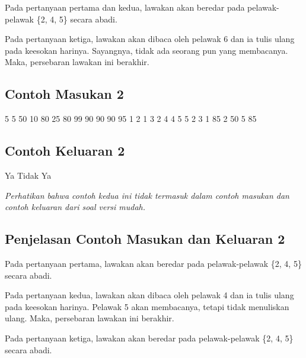 \documentclass[../main_problemset.tex]{subfiles} %
\begin{document}
Pada pertanyaan pertama dan kedua, lawakan akan beredar pada pelawak-pelawak \{2, 4, 5\} secara abadi.

Pada pertanyaan ketiga, lawakan akan dibaca oleh pelawak 6 dan ia tulis ulang pada keesokan harinya. Sayangnya, tidak ada seorang pun yang membacanya. Maka, persebaran lawakan ini berakhir.

\vspace{.4cm}

\begin{minipage}[t]{0.5\textwidth}
\subsection*{Contoh Masukan 2}

\begin{lcverbatim}
5 5
50 10 80 25 80
99 90 90 90 95
1 2
1 3
2 4
4 5
5 2
3
1 85
2 50
5 85
\end{lcverbatim}
\end{minipage}
\begin{minipage}[t]{0.5\textwidth}
\subsection*{Contoh Keluaran 2}

\begin{lcverbatim}
Ya
Tidak
Ya
\end{lcverbatim}
\end{minipage}

\textit{Perhatikan bahwa contoh kedua ini tidak termasuk dalam contoh masukan dan contoh keluaran dari soal versi mudah.}

\subsection*{Penjelasan Contoh Masukan dan Keluaran 2}

Pada pertanyaan pertama, lawakan akan beredar pada pelawak-pelawak \{2, 4, 5\} secara abadi.

Pada pertanyaan kedua, lawakan akan dibaca oleh pelawak 4 dan ia tulis ulang pada keesokan harinya. Pelawak 5 akan membacanya, tetapi tidak menuliskan ulang. Maka, persebaran lawakan ini berakhir.

Pada pertanyaan ketiga, lawakan akan beredar pada pelawak-pelawak \{2, 4, 5\} secara abadi.
\end{document}
